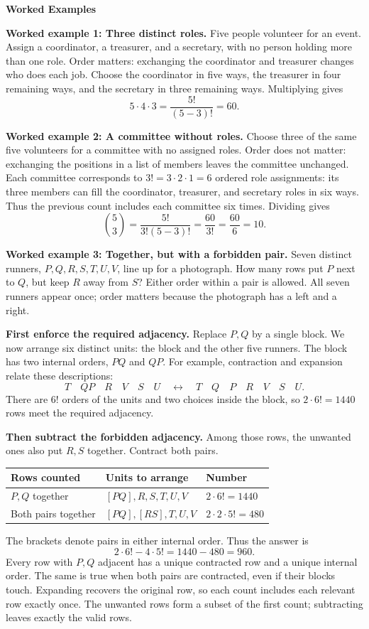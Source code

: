 \documentclass[11pt]{article}
\newcommand{\stageheading}[1]{%
  \par\Needspace{6\baselineskip}%
  \addvspace{.65\baselineskip}%
  {\centering\large\bfseries #1\par}%
  \nopagebreak[4]}
\begin{document}
\stageheading{Worked Examples}

\textbf{Worked example 1: Three distinct roles.}
Five people volunteer for an event. Assign a coordinator, a treasurer,
and a secretary, with no person holding more than one role. Order matters:
exchanging the coordinator and treasurer changes who does each job.
Choose the coordinator in five ways, the treasurer in four remaining
ways, and the secretary in three remaining ways. Multiplying gives
\[
5\cdot4\cdot3=\frac{5!}{(5-3)!}=\boxed{60}.
\]

\textbf{Worked example 2: A committee without roles.}
Choose three of the same five volunteers for a committee with no assigned
roles. Order does not matter: exchanging the positions in a list of
members leaves the committee unchanged. Each committee corresponds to
$3!=3\cdot2\cdot1=6$ ordered role assignments: its three members can
fill the coordinator, treasurer, and secretary roles in six ways.
Thus the previous count includes each committee six times. Dividing gives
\[
\binom{5}{3}=\frac{5!}{3!(5-3)!}=\frac{60}{3!}
=\frac{60}{6}=\boxed{10}.
\]


\textbf{Worked example 3: Together, but with a forbidden pair.}
Seven distinct runners, $P,Q,R,S,T,U,V$, line up for a photograph.
How many rows put $P$ next to $Q$, but keep $R$ away from $S$?
Either order within a pair is allowed. All seven runners appear once;
order matters because the photograph has a left and a right.

\textbf{First enforce the required adjacency.} Replace $P,Q$ by a
single block. We now arrange six distinct units: the block and the other
five runners. The block has two internal orders, $PQ$ and $QP$.
For example, contraction and expansion relate these descriptions:
\[
T\quad\boxed{QP}\quad R\quad V\quad S\quad U
\quad\longleftrightarrow\quad
T\quad Q\quad P\quad R\quad V\quad S\quad U.
\]
There are $6!$ orders of the units and two choices inside the block,
so $2\cdot6!=1440$ rows meet the required adjacency.

\textbf{Then subtract the forbidden adjacency.} Among those rows,
the unwanted ones also put $R,S$ together. Contract both pairs.
\begin{center}
\begin{tabular}{@{}lll@{}}
\toprule
Rows counted & Units to arrange & Number \\
\midrule
$P,Q$ together & $[PQ],R,S,T,U,V$ & $2\cdot6!=1440$ \\
Both pairs together & $[PQ],[RS],T,U,V$ & $2\cdot2\cdot5!=480$ \\
\bottomrule
\end{tabular}
\end{center}
The brackets denote pairs in either internal order. Thus the answer is
\[
2\cdot6!-4\cdot5!=1440-480=\boxed{960}.
\]
Every row with $P,Q$ adjacent has a unique contracted row and a unique
internal order. The same is true when both pairs are contracted, even
if their blocks touch. Expanding recovers the original row, so each
count includes each relevant row exactly once. The unwanted rows form
a subset of the first count; subtracting leaves exactly the valid rows.
\end{document}
